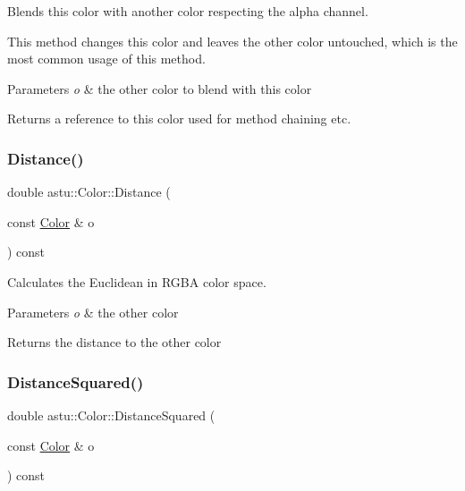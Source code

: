 Blends this color with another color respecting the alpha channel.

This method changes this color and leaves the other color untouched, which is the most common usage of this method.


\begin{DoxyParams}{Parameters}
{\em o} & the other color to blend with this color \\
\hline
\end{DoxyParams}
\begin{DoxyReturn}{Returns}
a reference to this color used for method chaining etc. 
\end{DoxyReturn}
\mbox{\label{classastu_1_1Color_a53b134d44a2fba57ed560f00ce55a471}} 
\subsubsection{\texorpdfstring{Distance()}{Distance()}}
{\footnotesize\ttfamily double astu\+::\+Color\+::\+Distance (\begin{DoxyParamCaption}\item[{const \hyperlink{classastu_1_1Color}{Color} \&}]{o }\end{DoxyParamCaption}) const}

Calculates the Euclidean in R\+G\+BA color space.


\begin{DoxyParams}{Parameters}
{\em o} & the other color \\
\hline
\end{DoxyParams}
\begin{DoxyReturn}{Returns}
the distance to the other color 
\end{DoxyReturn}
\mbox{\label{classastu_1_1Color_af57011227eea623101859b95127e364c}} 
\subsubsection{\texorpdfstring{Distance\+Squared()}{DistanceSquared()}}
{\footnotesize\ttfamily double astu\+::\+Color\+::\+Distance\+Squared (\begin{DoxyParamCaption}\item[{const \hyperlink{classastu_1_1Color}{Color} \&}]{o }\end{DoxyParamCaption}) const}

